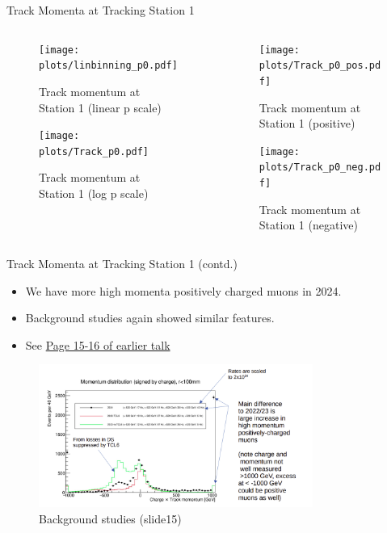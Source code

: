 \begin{frame}{Track Momenta at Tracking Station 1}
	\begin{columns}
		\begin{column}{0.5\textwidth}
			\vspace{-0.4cm}
			\begin{figure}
				\texttt{[image: \\plots/linbinning\_p0.pdf]}
				\caption{Track momentum at Station 1 (linear p scale)}
			\end{figure}
			\vspace{-0.9cm}
			\begin{figure}
				\texttt{[image: \\plots/Track\_p0.pdf]}
				\caption{Track momentum at Station 1 (log p scale)}
			\end{figure}
		\end{column}
		\begin{column}{0.5\textwidth}
			\vspace{-0.4cm}
			\begin{figure}
				\texttt{[image: \\plots/Track\_p0\_pos.pdf]}
				\caption{Track momentum at Station 1 (positive)}
			\end{figure}
			\vspace{-0.9cm}
			\begin{figure}
				\texttt{[image: \\plots/Track\_p0\_neg.pdf]}
				\caption{Track momentum at Station 1 (negative)}
			\end{figure}
		\end{column}
	\end{columns}
	

\end{frame}

\begin{frame}{Track Momenta at Tracking Station 1 (contd.)}
	\begin{itemize}
		\item We have more high momenta positively charged muons in 2024.
		\item Background studies again showed similar features.
		\item See \href{https://indico.cern.ch/event/1350790/contributions/5686387/attachments/2836819/4957405/Introduction.pdf}{Page 15-16 of earlier talk} 
	\end{itemize}
	\begin{figure}
		\centering
		\includegraphics[width=0.8\textwidth]{slide15.png}
		\caption{Background studies (slide15)}
	\end{figure}
\end{frame}